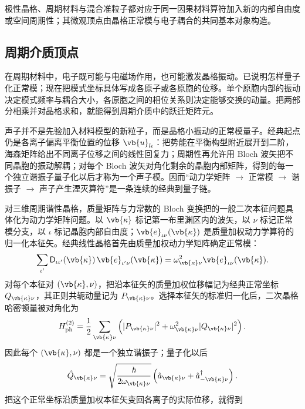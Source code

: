 极性晶格、周期材料与混合准粒子都对应于同一因果材料算符加入新的内部自由度或空间周期性；其微观顶点由晶格正常模与电子耦合的共同基本对象构造。

\subsection{周期介质顶点}\label{chap:feqo-structured-media}
在周期材料中，电子既可能与电磁场作用，也可能激发晶格振动。已说明怎样量子化正常模；现在把模式坐标具体写成各原子或各原胞的位移。单个原胞内部的振动决定模式频率与耦合大小，各原胞之间的相位关系则决定能够交换的动量。把两部分相乘并对晶格求和，就能得到周期介质中的跃迁矩阵元。

声子并不是先验加入材料模型的新粒子，而是晶格小振动的正常模量子。经典起点仍是各离子偏离平衡位置的位移 $\vb{u}_{l\iota}$：把势能在平衡构型附近展开到二阶，海森矩阵给出不同离子位移之间的线性回复力；周期性再允许用 Bloch 波矢把不同晶胞的振动解耦；对每个 Bloch 波矢对角化剩余的晶胞内部矩阵，得到的每一个独立谐振子量子化以后才称为一个声子模。因而“动力学矩阵 $\to$ 正常模 $\to$ 谐振子 $\to$ 声子产生湮灭算符”是一条连续的经典到量子链。

对三维周期谐性晶格，质量矩阵与力常数的 Bloch 变换把的一般二次本征问题具体化为动力学矩阵问题。以 $\vb{\kappa}$ 标记第一布里渊区内的波矢，以 $\nu$ 标记正常模分支，以 $\iota$ 标记晶胞内部自由度；$\vb{e}_{\iota\nu}(\vb{\kappa})$ 是质量加权动力学算符的归一化本征矢。经典线性晶格首先由质量加权动力学矩阵确定正常模：
\begin{equation}
{
\sum_{\iota'}\mathsf D_{\iota\iota'}(\vb{\kappa})
\,\vb{e}_{\iota'\nu}(\vb{\kappa})
=\omega_{\vb{\kappa}\nu}^2
\vb{e}_{\iota\nu}(\vb{\kappa}).}
\label{eq:phonon_normal_mode_eigenproblem}
\end{equation}
对每个本征对 $(\vb{\kappa},\nu)$，把沿本征矢的质量加权位移幅记为经典正常坐标 $Q_{\vb{\kappa}\nu}$，其正则共轭动量记为 $P_{\vb{\kappa}\nu}$。选择本征矢的标准归一化后，二次晶格哈密顿量被对角化为
\begin{equation*}
H_{\rm ph}^{(2)}
=\frac12\sum_{\vb{\kappa}\nu}
\left(|P_{\vb{\kappa}\nu}|^2
+\omega_{\vb{\kappa}\nu}^2|Q_{\vb{\kappa}\nu}|^2\right).
\end{equation*}
因此每个 $(\vb{\kappa},\nu)$ 都是一个独立谐振子；量子化以后
\begin{equation*}
\hat Q_{\vb{\kappa}\nu}
=\sqrt{\frac{\hbar}{2\omega_{\vb{\kappa}\nu}}}
\left(\hat a_{\vb{\kappa}\nu}
+\hat a_{-\vb{\kappa}\nu}^{\dagger}\right).
\end{equation*}
把这个正常坐标沿质量加权本征矢变回各离子的实际位移，就得到

